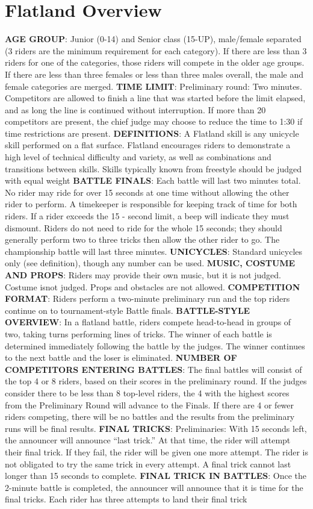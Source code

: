 \section{Flatland Overview}
\textbf{AGE GROUP}: Junior (0-14) and Senior class (15-UP), male/female separated (3 riders are the minimum requirement for each category). If there are less than 3 riders for one of the categories, those riders will compete in the older age groups. If there are less than three females or less than three males overall, the male and female categories are merged. 
\textbf{TIME LIMIT}: Preliminary round: Two minutes. Competitors are allowed to finish a line that was started before the limit
elapsed, and as long the line is continued without interruption. If more than 20 competitors are present, the chief judge may choose to reduce the time to 1:30 if time restrictions are present.
\textbf{DEFINITIONS}: A Flatland skill is any unicycle skill performed on a flat surface. Flatland encourages riders to
demonstrate a high level of technical difficulty and variety, as well as combinations and transitions between skills. Skills typically known from freestyle should be judged with equal weight 
\textbf{BATTLE FINALS}: Each battle will last two minutes total. No rider may ride for over 15 seconds at one time without allowing the other rider to perform. A timekeeper is responsible for keeping track of time for both riders. If a rider exceeds the 15 - second limit, a beep will indicate they must dismount. Riders do not need to ride for the whole 15 seconds; they should generally perform two to three tricks then allow the other rider to go. The championship battle will last three minutes.
\textbf{UNICYCLES}: Standard unicycles only (see definition), though any number can be used.
\textbf{MUSIC, COSTUME AND PROPS}: Riders may provide their own music, but it is not judged. Costume isnot judged. Props and obstacles are not allowed.
\textbf{COMPETITION FORMAT}: Riders perform a two-minute preliminary run and the top riders continue on to tournament-style Battle finals.
\textbf{BATTLE-STYLE OVERVIEW}: In a flatland battle, riders compete head-to-head in groups of two, taking turns performing lines of tricks. The winner of each battle is determined immediately following the battle by the judges. The winner continues to the next battle and the loser is eliminated. 
\textbf{NUMBER OF COMPETITORS ENTERING BATTLES}: The final battles will consist of the top 4 or 8 riders, based
on their scores in the preliminary round. If the judges consider there to be less than 8 top-level riders, the 4 with the highest scores from the Preliminary Round will advance to the Finals. If there are 4 or fewer riders competing, there will be no battles and the results from the preliminary runs will be final results.
\textbf{FINAL TRICKS}: Preliminaries: With 15 seconds left, the announcer will announce “last trick.” At that time, the rider
will attempt their final trick. If they fail, the rider will be given one more attempt. The rider is not obligated to try the
same trick in every attempt. A final trick cannot last longer than 15 seconds to complete.
\textbf{FINAL TRICK IN BATTLES}: Once the 2-minute battle is completed, the announcer will announce that it is time for the final tricks. Each rider has three attempts to land their final trick
